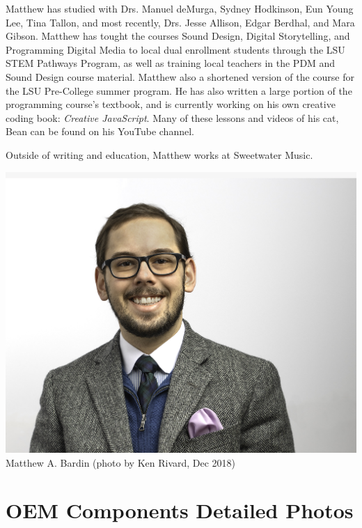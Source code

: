 Matthew has studied with Drs. Manuel deMurga, Sydney Hodkinson, Eun Young Lee, Tina Tallon, and most recently, Drs. Jesse Allison, Edgar Berdhal, and Mara Gibson. Matthew has tought the courses Sound Design, Digital Storytelling, and Programming Digital Media to local dual enrollment students through the LSU STEM Pathways Program, as well as training local teachers in the PDM and Sound Design course material. Matthew also a shortened version of the course for the LSU Pre-College summer program. He has also written a large portion of the programming course's textbook, and is currently working on his own creative coding book: \textit{Creative JavaScript}. Many of these lessons and videos of his cat, Bean can be found on his YouTube channel.

Outside of writing and education, Matthew works at Sweetwater Music. %


   \begin{center}
   \vspace{5mm}
       \includegraphics[scale=0.5]{Matt Bardin_web_head_4370.jpg}\\
        Matthew A. Bardin (photo by Ken Rivard, Dec 2018)
   \end{center}








\section{OEM Components Detailed Photos}


